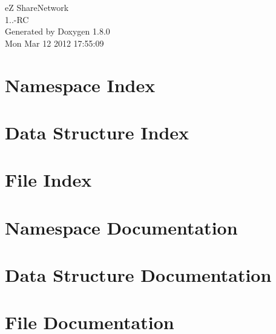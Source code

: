 \documentclass{book}
\begin{document}
\hypersetup{pageanchor=false,citecolor=blue}
\begin{titlepage}
\vspace*{7cm}
\begin{center}
{\Large e\-Z Share\-Network \\[1ex]\large 1..-\/\-R\-C }\\
\vspace*{1cm}
{\large Generated by Doxygen 1.8.0}\\
\vspace*{0.5cm}
{\small Mon Mar 12 2012 17:55:09}\\
\end{center}
\end{titlepage}
\clearemptydoublepage
{}
\tableofcontents
\clearemptydoublepage
{}
\hypersetup{pageanchor=true,citecolor=blue}
\chapter{Namespace Index}

\chapter{Data Structure Index}

\chapter{File Index}

\chapter{Namespace Documentation}



\chapter{Data Structure Documentation}

\chapter{File Documentation}







\printindex
\end{document}
